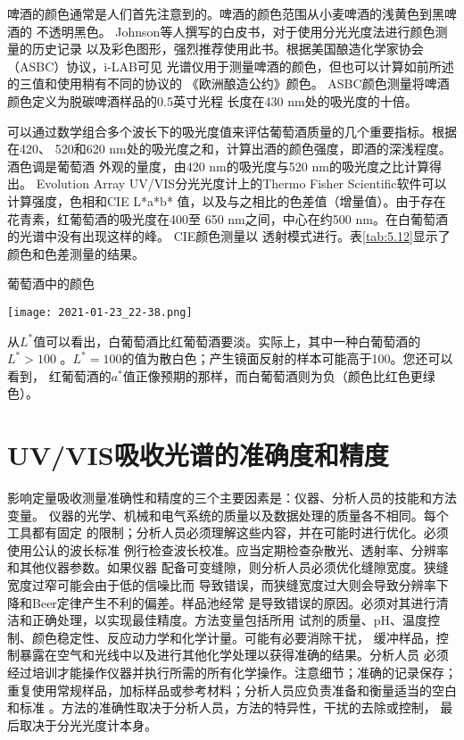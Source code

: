 啤酒的颜色通常是人们首先注意到的。啤酒的颜色范围从小麦啤酒的浅黄色到黑啤酒的
不透明黑色。 Johnson等人撰写的白皮书，对于使用分光光度法进行颜色测量的历史记录
以及彩色图形，强烈推荐使用此书。根据美国酿造化学家协会（ASBC）协议，i-LAB可见
光谱仪用于测量啤酒的颜色，但也可以计算如前所述的三值和使用稍有不同的协议的
《欧洲酿造公约》颜色。 ASBC颜色测量将啤酒颜色定义为脱碳啤酒样品的0.5英寸光程
长度在430 nm处的吸光度的十倍。

可以通过数学组合多个波长下的吸光度值来评估葡萄酒质量的几个重要指标。根据在420、
520和620 nm处的吸光度之和，计算出酒的颜色强度，即酒的深浅程度。酒色调是葡萄酒
外观的量度，由420 nm的吸光度与520 nm的吸光度之比计算得出。 Evolution Array 
UV/VIS分光光度计上的Thermo Fisher Scientific软件可以计算强度，色相和CIE L*a*b*
值，以及与之相比的色差值（增量值）。由于存在花青素，红葡萄酒的吸光度在400至
650 nm之间，中心在约500 nm。在白葡萄酒的光谱中没有出现这样的峰。 CIE颜色测量以
透射模式进行。表\ref{tab:5.12}显示了颜色和色差测量的结果。
\begin{table}[htbp]
    \centering
    \caption{葡萄酒中的颜色}
    \label{tab:5.12}
    \texttt{[image: 2021-01-23\_22-38.png]}
\end{table}

从$L^*$值可以看出，白葡萄酒比红葡萄酒要淡。实际上，其中一种白葡萄酒的$L^*>100$
。$ L^ * = 100$的值为散白色；产生镜面反射的样本可能高于100。您还可以看到，
红葡萄酒的$a^*$值正像预期的那样，而白葡萄酒则为负（颜色比红色更绿色）。
\section{UV/VIS吸收光谱的准确度和精度}
影响定量吸收测量准确性和精度的三个主要因素是：仪器、分析人员的技能和方法变量。
仪器的光学、机械和电气系统的质量以及数据处理的质量各不相同。每个工具都有固定
的限制；分析人员必须理解这些内容，并在可能时进行优化。必须使用公认的波长标准
例行检查波长校准。应当定期检查杂散光、透射率、分辨率和其他仪器参数。如果仪器
配备可变缝隙，则分析人员必须优化缝隙宽度。狭缝宽度过窄可能会由于低的信噪比而
导致错误，而狭缝宽度过大则会导致分辨率下降和Beer定律产生不利的偏差。样品池经常
是导致错误的原因。必须对其进行清洁和正确处理，以实现最佳精度。方法变量包括所用
试剂的质量、pH、温度控制、颜色稳定性、反应动力学和化学计量。可能有必要消除干扰，
缓冲样品，控制暴露在空气和光线中以及进行其他化学处理以获得准确的结果。分析人员
必须经过培训才能操作仪器并执行所需的所有化学操作。注意细节；准确的记录保存；
重复使用常规样品，加标样品或参考材料；分析人员应负责准备和衡量适当的空白和标准
。方法的准确性取决于分析人员，方法的特异性，干扰的去除或控制，
最后取决于分光光度计本身。


